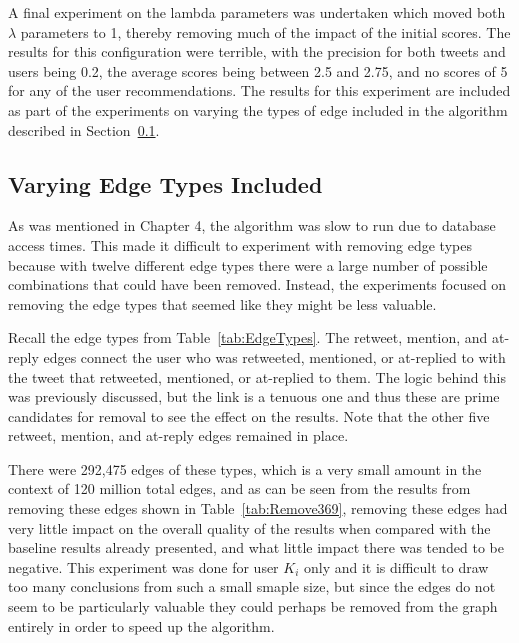 A final experiment on the lambda parameters was undertaken which moved both $\lambda$ parameters to 1, thereby removing much of the impact of the initial scores. The results for this configuration were terrible, with the precision for both tweets and users being 0.2, the average scores being between 2.5 and 2.75, and no scores of 5 for any of the user recommendations. The results for this experiment are included as part of the experiments on varying the types of edge included in the algorithm described in Section~\ref{sec:VaryingEdgeTypes}.



\subsection{Varying Edge Types Included}
\label{sec:VaryingEdgeTypes}

As was mentioned in Chapter 4, the algorithm was slow to run due to database access times. This made it difficult to experiment with removing edge types because with twelve different edge types there were a large number of possible combinations that could have been removed. Instead, the experiments focused on removing the edge types that seemed like they might be less valuable.

Recall the edge types from Table~\ref{tab:EdgeTypes}. The retweet, mention, and at-reply edges connect the user who was retweeted, mentioned, or at-replied to with the tweet that retweeted, mentioned, or at-replied to them. The logic behind this was previously discussed, but the link is a tenuous one and thus these are prime candidates for removal to see the effect on the results. Note that the other five retweet, mention, and at-reply edges remained in place.

There were 292,475 edges of these types, which is a very small amount in the context of 120 million total edges, and as can be seen from the results from removing these edges shown in Table~\ref{tab:Remove369}, removing these edges had very little impact on the overall quality of the results when compared with the baseline results already presented, and what little impact there was tended to be negative. This experiment was done for user $K_{i}$ only and it is difficult to draw too many conclusions from such a small smaple size, but since the edges do not seem to be particularly valuable they could perhaps be removed from the graph entirely in order to speed up the algorithm.


